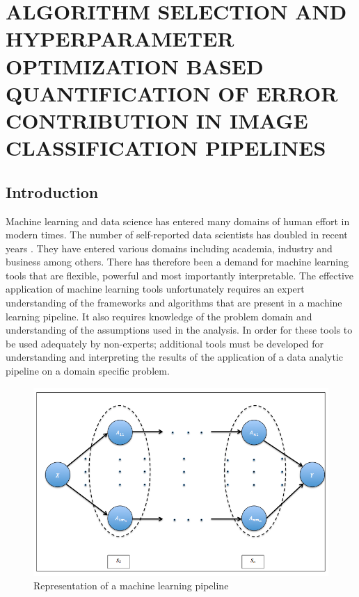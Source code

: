 \chapter{ALGORITHM SELECTION AND HYPERPARAMETER OPTIMIZATION BASED QUANTIFICATION OF ERROR CONTRIBUTION IN IMAGE CLASSIFICATION PIPELINES}
\label{chap:EP}

\let\thefootnote\relax\footnotetext{}


\section{Introduction} 
\label{sec1}
Machine learning and data science has entered many domains of human effort in modern times. The number of self-reported data scientists has doubled in recent years \cite{harrison1995validity}. They have entered various domains including academia, industry and business among others. There has therefore been a demand for machine learning tools that are flexible, powerful and most importantly interpretable. The effective application of machine learning tools unfortunately requires an expert understanding of the frameworks and algorithms that are present in a machine learning pipeline. It also requires knowledge of the problem domain and understanding of the assumptions used in the analysis. In order for these tools to be used adequately by non-experts; additional tools must be developed for understanding and interpreting the results of the application of a data analytic pipeline on a domain specific problem.  

\begin{figure}[H]
    \centering
    \includegraphics[scale=0.5]{img/EP/generalized_pipeline}
    \caption{Representation of a machine learning pipeline}
    \label{fig:pipeline}
\end{figure}

